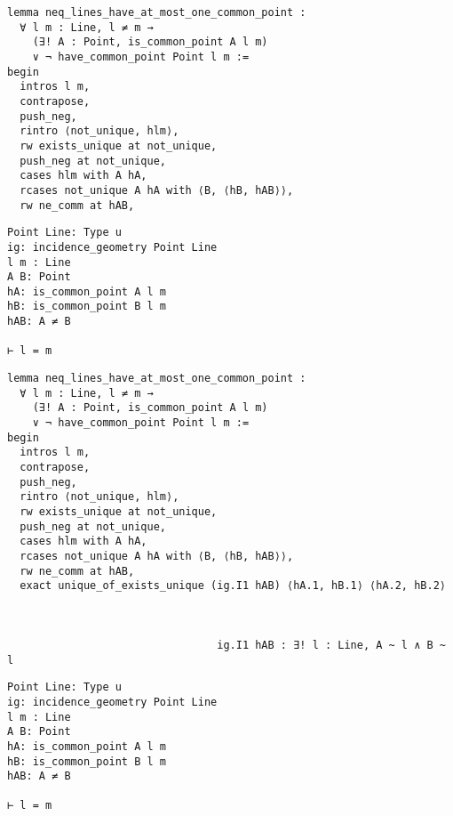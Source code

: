 \begin{frame}[fragile]
	\begin{multicols}{2}
		\begin{lstlisting}
lemma neq_lines_have_at_most_one_common_point :
  ∀ l m : Line, l ≠ m → 
    (∃! A : Point, is_common_point A l m) 
    ∨ ¬ have_common_point Point l m := 
begin
  intros l m,
  contrapose,
  push_neg,
  rintro ⟨not_unique, hlm⟩,
  rw exists_unique at not_unique,
  push_neg at not_unique,
  cases hlm with A hA,
  rcases not_unique A hA with ⟨B, ⟨hB, hAB⟩⟩,
  rw ne_comm at hAB,
\end{lstlisting}
		\columnbreak
		\begin{lstlisting}
Point Line: Type u
ig: incidence_geometry Point Line
l m : Line
A B: Point
hA: is_common_point A l m
hB: is_common_point B l m
hAB: A ≠ B

⊢ l = m
\end{lstlisting}
	\end{multicols}
\end{frame}



















\begin{frame}[fragile]
	\begin{multicols}{2}
		\begin{lstlisting}
lemma neq_lines_have_at_most_one_common_point :
  ∀ l m : Line, l ≠ m → 
    (∃! A : Point, is_common_point A l m) 
    ∨ ¬ have_common_point Point l m := 
begin
  intros l m,
  contrapose,
  push_neg,
  rintro ⟨not_unique, hlm⟩,
  rw exists_unique at not_unique,
  push_neg at not_unique,
  cases hlm with A hA,
  rcases not_unique A hA with ⟨B, ⟨hB, hAB⟩⟩,
  rw ne_comm at hAB,
  exact unique_of_exists_unique (ig.I1 hAB) ⟨hA.1, hB.1⟩ ⟨hA.2, hB.2⟩

  

                                 ig.I1 hAB : ∃! l : Line, A ~ l ∧ B ~ l
\end{lstlisting}
		\columnbreak
		\begin{lstlisting}
Point Line: Type u
ig: incidence_geometry Point Line
l m : Line
A B: Point
hA: is_common_point A l m
hB: is_common_point B l m
hAB: A ≠ B

⊢ l = m
\end{lstlisting}
	\end{multicols}
\end{frame}










